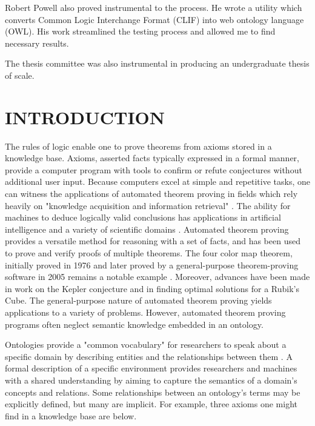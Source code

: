 \documentclass{article}
\begin{document}
Robert Powell also proved instrumental to the process. He wrote a utility which converts Common Logic Interchange Format (CLIF) into web ontology language (OWL). His work streamlined the testing process and allowed me to find necessary results. 

The thesis committee was also instrumental in producing an undergraduate thesis of scale.

\newpage
{}
\tableofcontents

\newpage
{}
\vspace*{.05in}
\listoffigures

\newpage
{}
\vspace*{.05in}
\listoftables

\newpage
{}
\setcounter{page}{1}
\vspace*{.05in}
\section{\MakeUppercase{Introduction}}

The rules of logic enable one to prove theorems from axioms stored in a knowledge base. Axioms, asserted facts typically expressed in a formal manner, provide a computer program with tools to confirm or refute conjectures without additional user input. Because computers excel at simple and repetitive tasks, one can witness the applications of automated theorem proving in fields which rely heavily on "knowledge acquisition and information retrieval" \cite{sanchez2012ontology}. The ability for machines to deduce logically valid conclusions has applications in artificial intelligence and a variety of scientific domains \cite{urban2011overview}. Automated theorem proving provides a versatile method for reasoning with a set of facts, and has been used to prove and verify proofs of multiple theorems. The four color map theorem, initially proved in 1976 and later proved by a general-purpose theorem-proving software in 2005 remains a notable example \cite{gonthier2008formal}. Moreover, advances have been made in work on the Kepler conjecture and in finding optimal solutions for a Rubik's Cube. The general-purpose nature of automated theorem proving yields applications to a variety of problems. However, automated theorem proving programs often neglect semantic knowledge embedded in an ontology.

Ontologies provide a "common vocabulary" for researchers to speak about a specific domain by describing entities and the relationships between them \cite{noy2001ontology}. A formal description of a specific environment provides researchers and machines with a shared understanding by aiming to capture the semantics of a domain's concepts and relations. Some relationships between an ontology's terms may be explicitly defined, but many are implicit. For example, three axioms one might find in a knowledge base are below. 
\end{document}
